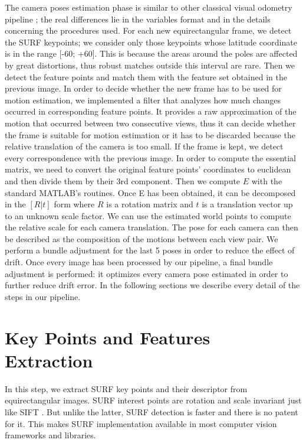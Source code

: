 The camera poses estimation phase is similar to other classical visual 
odometry pipeline \cite{scaramuzzaVisualOdometryI,moravec1980obstacle};
the real differences lie in the variables format and in 
the details concerning the procedures used. For each new equirectangular frame, we detect the
SURF keypoints; we consider only those keypoints whose latitude coordinate is in
the range [-60\degree; +60\degree]. This is because the areas around the poles 
are affected by great distortions, thus robust matches outside this interval are
rare.
Then we detect the feature points and match them with the feature set 
obtained in the previous image.
%
In order to decide whether the new frame has to be used for motion estimation, 
we implemented a filter that analyzes how much changes occurred in 
corresponding feature points. It provides a raw approximation of the 
motion that occurred between two consecutive views, thus it can decide whether 
the frame is suitable for motion estimation or it has to be discarded because 
the relative translation of the camera is too small.
%
If the frame is kept, we detect every correspondence with the previous image.
In order to compute the essential matrix, we need to convert the original 
feature points' coordinates to euclidean and then divide them by their 3rd 
component. Then we compute $E$ with the standard MATLAB's routines.
Once E has been obtained, it can be decomposed in the \([R|t]\)
form where $R$ is a rotation matrix and $t$ is a translation vector up to 
an unknown scale factor.
We can use the estimated world points to compute the relative scale for each
camera translation.
The pose for each camera can then be described as the composition of the 
motions between each view pair. We perform a bundle adjustment for the last 5 
poses in order to reduce the effect of drift.
Once every image has been processed by our pipeline, a final 
bundle adjustment is performed: it optimizes every camera pose estimated in order to 
further reduce drift error.
In the following sections we describe every detail of the steps in our pipeline.

\section{Key Points and Features Extraction}
In this step, we extract SURF key points and their descriptor 
\cite{funayama2012robust} from equirectangular images. SURF 
interest points are rotation and scale invariant just like SIFT
\cite{lowe1999object}. But unlike 
the latter, SURF detection is faster and there is no patent for it. 
This makes SURF implementation available in most computer vision frameworks and 
libraries.


